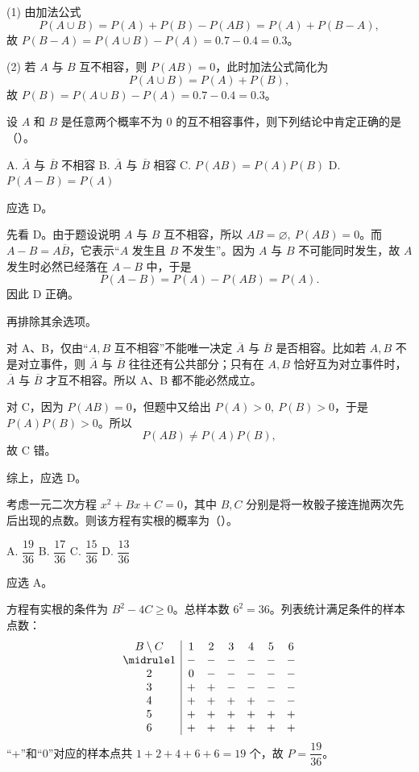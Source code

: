 ﻿\documentclass[lang=cn,11pt]{elegantbook}
\begin{document}
\begin{solution}
(1) 由加法公式
\[
P(A \cup B) = P(A) + P(B) - P(AB) = P(A) + P(B - A),
\]
故 \(P(B - A) = P(A \cup B) - P(A) = 0.7 - 0.4 = 0.3\)。

(2) 若 \(A\) 与 \(B\) 互不相容，则 \(P(AB) = 0\)，此时加法公式简化为
\[
P(A \cup B) = P(A) + P(B),
\]
故 \(P(B) = P(A \cup B) - P(A) = 0.7 - 0.4 = 0.3\)。
\end{solution}


\begin{exercise}\label{exer:1-27}
设 \(A\) 和 \(B\) 是任意两个概率不为 0 的互不相容事件，则下列结论中肯定正确的是（\quad）。\par
A. \(\overline{A}\) 与 \(\overline{B}\) 不相容\quad
B. \(\overline{A}\) 与 \(\overline{B}\) 相容\quad
C. \(P(AB) = P(A)P(B)\)\quad
D. \(P(A-B) = P(A)\)
\end{exercise}

\begin{solution}
应选 D。

先看 D。由于题设说明 \(A\) 与 \(B\) 互不相容，所以 \(AB=\varnothing,\ P(AB)=0\)。而 \(A-B=A\overline{B}\)，它表示“\(A\) 发生且 \(B\) 不发生”。因为 \(A\) 与 \(B\) 不可能同时发生，故 \(A\) 发生时必然已经落在 \(A-B\) 中，于是
\[
P(A-B)=P(A)-P(AB)=P(A).
\]
因此 D 正确。

再排除其余选项。

对 A、B，仅由“\(A,B\) 互不相容”不能唯一决定 \(\overline{A}\) 与 \(\overline{B}\) 是否相容。比如若 \(A,B\) 不是对立事件，则 \(\overline{A}\) 与 \(\overline{B}\) 往往还有公共部分；只有在 \(A,B\) 恰好互为对立事件时，\(\overline{A}\) 与 \(\overline{B}\) 才互不相容。所以 A、B 都不能必然成立。

对 C，因为
\(P(AB)=0\)，但题中又给出 \(P(A)>0,\ P(B)>0\)，于是 \(P(A)P(B)>0\)。所以
\[
P(AB)\neq P(A)P(B),
\]
故 C 错。

综上，应选 D。
\end{solution}
\begin{exercise}\label{exer:1-35}
考虑一元二次方程 \(x^2+Bx+C=0\)，其中 \(B,C\) 分别是将一枚骰子接连抛两次先后出现的点数。则该方程有实根的概率为（\quad）。\par
A. \(\dfrac{19}{36}\)\quad
B. \(\dfrac{17}{36}\)\quad
C. \(\dfrac{15}{36}\)\quad
D. \(\dfrac{13}{36}\)
\end{exercise}

\begin{solution}
应选 A。

方程有实根的条件为 \(B^2-4C\ge 0\)。总样本数 \(6^2=36\)。列表统计满足条件的样本点数：
\[
\begin{array}{c|cccccc}
B\setminus C & 1 & 2 & 3 & 4 & 5 & 6 \\
\midrule
1 & - & - & - & - & - & - \\
2 & 0 & - & - & - & - & - \\
3 & + & + & - & - & - & - \\
4 & + & + & + & + & - & - \\
5 & + & + & + & + & + & + \\
6 & + & + & + & + & + & + \\
\end{array}
\]
``+''和``0''对应的样本点共 \(1+2+4+6+6=19\) 个，故 \(P=\dfrac{19}{36}\)。
\end{solution}
\end{document}
